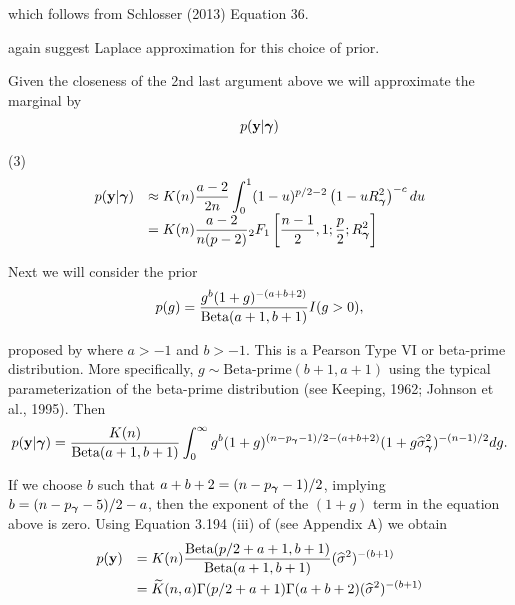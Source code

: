 \documentclass{article}[12pt]
\begin{document}
\noindent which follows from Schlosser (2013) Equation 36.

\cite{Liang2008} again suggest Laplace approximation 
for this choice of prior. 

Given the closeness of the 2nd last argument above
we will approximate the marginal by
$$
\begin{array}{rl}
p(\vy|\vgamma) 

\end{array} 
$$ 

(3)
$$
\begin{array}{rl}
p({\bf y}|{\boldsymbol \gamma}) 
& \displaystyle \approx K(n) \frac{a - 2}{2n}  \int_0^1 
(1 - u)^{p/2 - 2} \left(  1 - u R_{\boldsymbol \gamma}^2\right)^{-c} du
\\
& \displaystyle = K(n) \frac{a - 2}{n(p - 2)} {}_2 F_1\left[
\frac{n-1}{2}, 1; \frac{p}{2}; R_{\boldsymbol \gamma}^2
\right]
\end{array} 
$$ 




Next we will consider the prior 
\begin{equation}\label{eq:betaPrime}
\displaystyle p(g) = \frac{g^{b}(1 + g)^{-(a+b+2)}}{\mbox{Beta}(a+1,b+1)} I(g>0),
\end{equation}

\noindent proposed by \cite{Maruyama2011} where $a>-1$ and $b>-1$. 
This is a Pearson Type VI or beta-prime distribution. More specifically, 
$g\sim \mbox{Beta-prime}(b+1,a+1)$ using the typical parameterization of 
the beta-prime distribution (see Keeping, 1962; Johnson et al., 1995).
Then
$$
\displaystyle p({\bf y}|{\boldsymbol \gamma}) 
=
\frac{K(n)}{\mbox{Beta}(a+1,b+1)}
\int_0^\infty             
g^{b}(1 + g)^{(n - p_{\boldsymbol \gamma} - 1)/2 - (a + b + 2)}  (1 + g \widehat{\sigma}_{\boldsymbol \gamma}^2 )^{-(n-1)/2}  
dg.
$$

\noindent If we choose $b$ such that
$a+b+2 = (n - p_{\boldsymbol \gamma} - 1)/2$, implying
$b = (n - p_{\boldsymbol \gamma} - 5)/2 - a$, then the exponent of the $(1 + g)$ term in the equation above is zero.
Using Equation 3.194 (iii) of \cite{Gradshteyn2007}
(see Appendix A) we obtain
\begin{equation}\label{eq:marginalLikelihood}
\begin{array}{rl}
\displaystyle p({\bf y}) 
& \displaystyle 
=  K(n)
\frac{\mbox{Beta}(p/2 + a + 1,b + 1)}{\mbox{Beta}(a+1,b+1)} (\widehat{\sigma}^2)^{-(b + 1)}
\\ [2ex]
& \displaystyle = \widetilde{K}(n,a)

\Gamma(p/2 + a + 1)\Gamma(a + b + 2)
(\widehat{\sigma}^2)^{-(b + 1)}
\end{array}
\end{equation}
\end{document}
